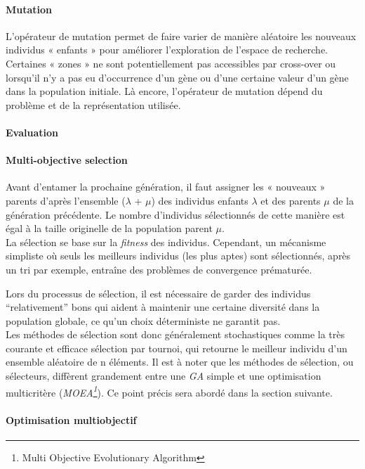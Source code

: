 \documentclass[12pt]{memoir}
\begin{document}
\paragraph{Mutation} %
\label{par:Mutation}
L’opérateur de mutation permet de faire varier de manière aléatoire les nouveaux
individus « enfants » pour améliorer l’exploration de l’espace de recherche. Certaines «
zones » ne sont potentiellement pas accessibles par cross-over ou lorsqu’il n’y a pas eu
d’occurrence d’un gène ou d’une certaine valeur d’un gène dans la population initiale.
Là encore, l’opérateur de mutation dépend du problème et de la représentation utilisée.
\paragraph{Evaluation} %
\label{par:Evaluation}
\paragraph{Multi-objective selection } %
Avant d'entamer la prochaine génération, il faut assigner les « nouveaux
» parents d'après l'ensemble ($\lambda$ + $\mu$) des individus enfants
$\lambda$ et des parents $\mu$ de la génération précédente. Le nombre
d'individus sélectionnés de cette manière est égal à la taille
originelle de la population parent $\mu$. \\
La sélection se base sur la \emph{fitness} des individus. Cependant, un
mécanisme simpliste où seuls les meilleurs individus (les plus aptes)
sont sélectionnés, après un tri par exemple, entraîne des problèmes de
convergence prématurée.

\bigskip
Lors du processus de sélection, il est nécessaire de garder des
individus ``relativement\cite{sharma2010archived,deb2002fast}'' bons qui aident à maintenir une certaine
diversité dans la population globale, ce qu'un choix déterministe ne
garantit pas. \\
Les méthodes de sélection sont donc généralement stochastiques comme la
très courante et efficace sélection par tournoi, qui retourne le
meilleur individu d'un ensemble aléatoire de n éléments. 
Il est à noter que les méthodes de sélection, ou sélecteurs, diffèrent
grandement entre une \emph{GA} simple et une optimisation multicritère
(\emph{MOEA\footnote{Multi Objective Evolutionary Algorithm}}). Ce point précis sera abordé dans la section suivante.

\paragraph{Optimisation
multiobjectif}\label{optimisation-multiobjectif}
\end{document}
